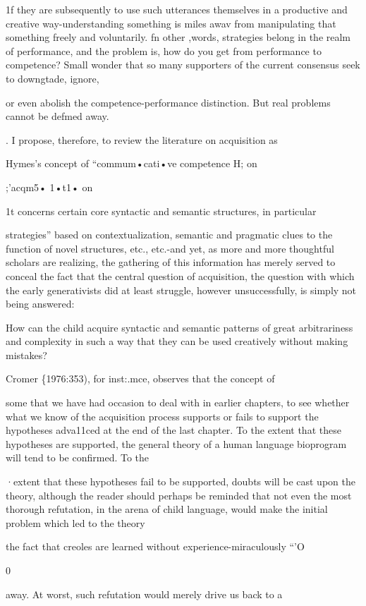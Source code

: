 1f they are subsequently to use such utterances themselves in a produc\-tive and creative way-understanding something is miles awav from manipulating that something freely and voluntarily. fn other ,words, strategies belong in the realm of performance, and the problem is, how do you get from performance to competence? Small wonder that so many supporters of the current consensus seek to downgtade, ignore,

or even abolish the competence-performance distinction. But real problems cannot be defmed away.

. I propose, therefore, to review the literature on acquisition as

Hymes's concept of ``commum•cati•ve competence H; on

;'acqm5• 1•t1• on

1t concerns certain core syntactic and semantic structures, in particular

strategies'' based on contextualization, semantic and pragmatic clues to the function of novel structures, etc., etc.-and yet, as more and more thoughtful scholars are realizing, the gathering of this information has merely served to conceal the fact that the central question of acquisition, the question with which the early generativists did at least struggle, however unsuccessfully, is simply not being answered:

How can the child acquire syntactic and semantic patterns of great arbitrariness and complexity in such a way that they can be used creatively without making mistakes?

Cromer \{1976:353), for inst:.mce, observes that the concept of

some that we have had occasion to deal with in earlier chapters, to see whether what we know of the acquisition process supports or fails to support the hypotheses adva11ced at the end of the last chapter. To the extent that these hypotheses are supported, the general theory of a human language bioprogram will tend to be confirmed. To the

·extent that these hypotheses fail to be supported, doubts will be cast upon the theory, although the reader should perhaps be reminded that not even the most thorough refutation, in the arena of child language, would make the initial problem which led to the theory\-

the fact that creoles are learned without experience-miraculously ``'O

0

away. At worst, such refutation would merely drive us back to a

